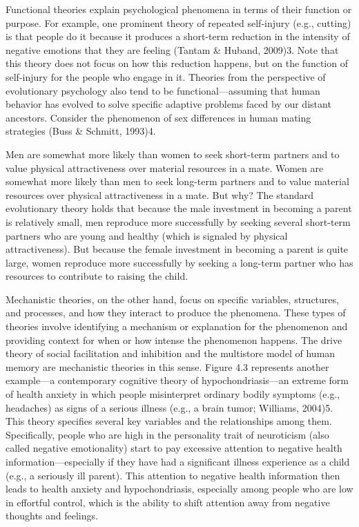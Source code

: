 Functional theories explain psychological phenomena in terms of their function or purpose. For example, one prominent theory of repeated self-injury (e.g., cutting) is that people do it because it produces a short-term reduction in the intensity of negative emotions that they are feeling (Tantam \& Huband, 2009)3. Note that this theory does not focus on how this reduction happens, but on the function of self-injury for the people who engage in it. Theories from the perspective of evolutionary psychology also tend to be functional---assuming that human behavior has evolved to solve specific adaptive problems faced by our distant ancestors. Consider the phenomenon of sex differences in human mating strategies (Buss \& Schmitt, 1993)4.

Men are somewhat more likely than women to seek short-term partners and to value physical attractiveness over material resources in a mate. Women are somewhat more likely than men to seek long-term partners and to value material resources over physical attractiveness in a mate. But why? The standard evolutionary theory holds that because the male investment in becoming a parent is relatively small, men reproduce more successfully by seeking several short-term partners who are young and healthy (which is signaled by physical attractiveness). But because the female investment in becoming a parent is quite large, women reproduce more successfully by seeking a long-term partner who has resources to contribute to raising the child.

Mechanistic theories, on the other hand, focus on specific variables, structures, and processes, and how they interact to produce the phenomena. These types of theories involve identifying a mechanism or explanation for the phenomenon and providing context for when or how intense the phenomenon happens. The drive theory of social facilitation and inhibition and the multistore model of human memory are mechanistic theories in this sense. Figure 4.3 represents another example---a contemporary cognitive theory of hypochondriasis---an extreme form of health anxiety in which people misinterpret ordinary bodily symptoms (e.g., headaches) as signs of a serious illness (e.g., a brain tumor; Williams, 2004)5. This theory specifies several key variables and the relationships among them. Specifically, people who are high in the personality trait of neuroticism (also called negative emotionality) start to pay excessive attention to negative health information---especially if they have had a significant illness experience as a child (e.g., a seriously ill parent). This attention to negative health information then leads to health anxiety and hypochondriasis, especially among people who are low in effortful control, which is the ability to shift attention away from negative thoughts and feelings.

